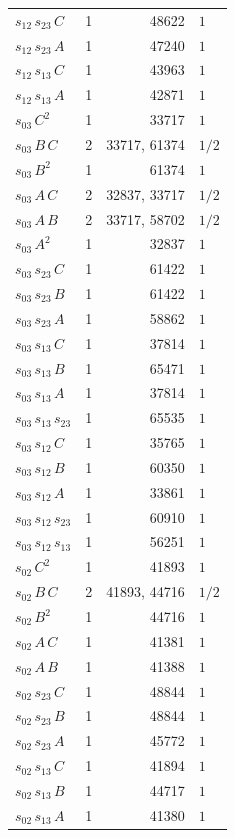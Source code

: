 \begin{longtable}{lrrl}
$s_{12}\,s_{23}\,C$ & 1 & 48622 & $1$ \\
$s_{12}\,s_{23}\,A$ & 1 & 47240 & $1$ \\
$s_{12}\,s_{13}\,C$ & 1 & 43963 & $1$ \\
$s_{12}\,s_{13}\,A$ & 1 & 42871 & $1$ \\
$s_{03}\,C^{2}$ & 1 & 33717 & $1$ \\
$s_{03}\,B\,C$ & 2 & 33717, 61374 & $1/2$ \\
$s_{03}\,B^{2}$ & 1 & 61374 & $1$ \\
$s_{03}\,A\,C$ & 2 & 32837, 33717 & $1/2$ \\
$s_{03}\,A\,B$ & 2 & 33717, 58702 & $1/2$ \\
$s_{03}\,A^{2}$ & 1 & 32837 & $1$ \\
$s_{03}\,s_{23}\,C$ & 1 & 61422 & $1$ \\
$s_{03}\,s_{23}\,B$ & 1 & 61422 & $1$ \\
$s_{03}\,s_{23}\,A$ & 1 & 58862 & $1$ \\
$s_{03}\,s_{13}\,C$ & 1 & 37814 & $1$ \\
$s_{03}\,s_{13}\,B$ & 1 & 65471 & $1$ \\
$s_{03}\,s_{13}\,A$ & 1 & 37814 & $1$ \\
$s_{03}\,s_{13}\,s_{23}$ & 1 & 65535 & $1$ \\
$s_{03}\,s_{12}\,C$ & 1 & 35765 & $1$ \\
$s_{03}\,s_{12}\,B$ & 1 & 60350 & $1$ \\
$s_{03}\,s_{12}\,A$ & 1 & 33861 & $1$ \\
$s_{03}\,s_{12}\,s_{23}$ & 1 & 60910 & $1$ \\
$s_{03}\,s_{12}\,s_{13}$ & 1 & 56251 & $1$ \\
$s_{02}\,C^{2}$ & 1 & 41893 & $1$ \\
$s_{02}\,B\,C$ & 2 & 41893, 44716 & $1/2$ \\
$s_{02}\,B^{2}$ & 1 & 44716 & $1$ \\
$s_{02}\,A\,C$ & 1 & 41381 & $1$ \\
$s_{02}\,A\,B$ & 1 & 41388 & $1$ \\
$s_{02}\,s_{23}\,C$ & 1 & 48844 & $1$ \\
$s_{02}\,s_{23}\,B$ & 1 & 48844 & $1$ \\
$s_{02}\,s_{23}\,A$ & 1 & 45772 & $1$ \\
$s_{02}\,s_{13}\,C$ & 1 & 41894 & $1$ \\
$s_{02}\,s_{13}\,B$ & 1 & 44717 & $1$ \\
$s_{02}\,s_{13}\,A$ & 1 & 41380 & $1$ \\

\end{longtable}
